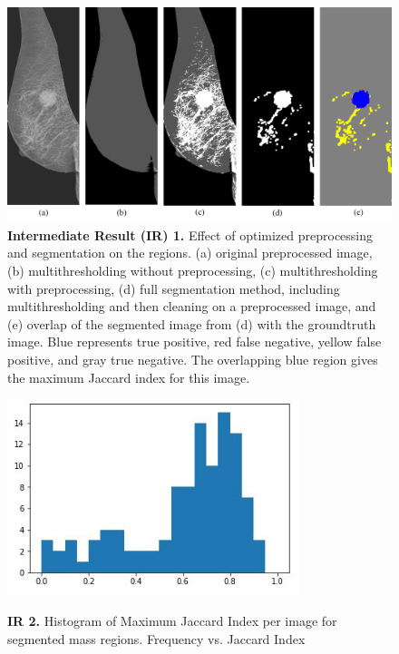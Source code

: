 \documentclass{article}
\begin{document}

\begin{figure}
    \centering
    \includegraphics[width=6in]{segmentation_effect.png}
    \caption*{\textbf{Intermediate Result (IR) 1. }Effect of optimized preprocessing and segmentation on the regions. (a) original preprocessed image, (b) multithresholding without preprocessing, (c) multithresholding with preprocessing, (d) full segmentation method, including multithresholding and then cleaning on a preprocessed image, and (e) overlap of the segmented image from (d) with the groundtruth image. Blue represents true positive, red false negative, yellow false positive, and gray true negative. The overlapping blue region gives the maximum Jaccard index for this image.}
    \label{fig:lots_segmentation}
\end{figure}








\begin{figure}
    \centering
    \caption*{\textbf{IR 2. }Histogram of Maximum Jaccard Index per image for segmented mass regions. Frequency vs. Jaccard Index}
    \includegraphics[width=8.5cm]{Jaccard_histogram.JPG}
    \label{fig:histogramjaccard}
\end{figure}
\end{document}
